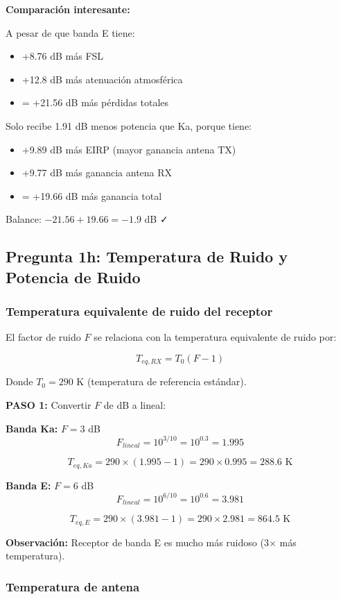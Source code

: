 \documentclass[a4paper,10pt]{article}
\begin{document}
\textbf{Comparación interesante:}

A pesar de que banda E tiene:
\begin{itemize}
    \item +8.76 dB más FSL
    \item +12.8 dB más atenuación atmosférica
    \item = +21.56 dB más pérdidas totales
\end{itemize}

Solo recibe 1.91 dB menos potencia que Ka, porque tiene:
\begin{itemize}
    \item +9.89 dB más EIRP (mayor ganancia antena TX)
    \item +9.77 dB más ganancia antena RX
    \item = +19.66 dB más ganancia total
\end{itemize}

Balance: $-21.56 + 19.66 = -1.9$ dB ✓

\subsection{Pregunta 1h: Temperatura de Ruido y Potencia de Ruido}

\subsubsection{Temperatura equivalente de ruido del receptor}

El factor de ruido $F$ se relaciona con la temperatura equivalente de ruido por:

$$T_{eq,RX} = T_0(F - 1)$$

Donde $T_0 = 290$ K (temperatura de referencia estándar).

\textbf{PASO 1:} Convertir $F$ de dB a lineal:

\textbf{Banda Ka:} $F = 3$ dB
$$F_{lineal} = 10^{3/10} = 10^{0.3} = 1.995$$

$$T_{eq,Ka} = 290 \times (1.995 - 1) = 290 \times 0.995 = \boxed{288.6 \text{ K}}$$

\textbf{Banda E:} $F = 6$ dB
$$F_{lineal} = 10^{6/10} = 10^{0.6} = 3.981$$

$$T_{eq,E} = 290 \times (3.981 - 1) = 290 \times 2.981 = \boxed{864.5 \text{ K}}$$

\textbf{Observación:} Receptor de banda E es mucho más ruidoso (3× más temperatura).

\subsubsection{Temperatura de antena}
\end{document}
